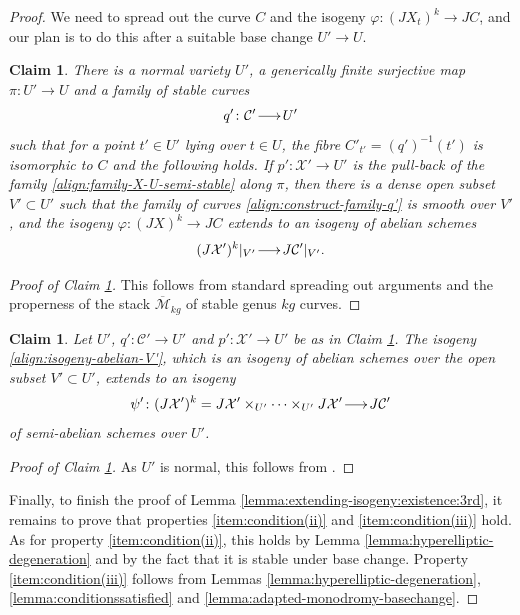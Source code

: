 \documentclass[a4paper,11pt,reqno]{amsart}
\makeatletter
\numberwithin{equation}{section}
\theoremstyle{plain}
\newtheorem{claim}[theorem]{Claim}
\theoremstyle{definition}
\newcommand{\ca}[1]{{\mathcal{#1}}}
\renewcommand{\longrightarrow}{\xymatrix@1@=15pt{\ar[r]&}}
\makeatother
\begin{document}
\begin{proof} 
We need to spread out the curve $C$ and the isogeny $\varphi \colon (JX_t)^k \to JC$, and our plan is to do this after a suitable base change $U' \to U$. 

\begin{claim} \label{claim:claimm1}
    There is a normal variety $U'$, a generically finite surjective map $\pi \colon U'  \to U$  
    and a family of stable curves \begin{align} \label{align:construct-family-q'}q' \colon \ca C' \longrightarrow U'\end{align} 
    such that for a point $t' \in U'$ lying over $t \in U$, the fibre $C'_{t'} = (q')^{-1}(t')$ is isomorphic to $C$ and the following holds.
    If $p' \colon \ca X' \to U'$ is the pull-back of the family \eqref{align:family-X-U-semi-stable} along $\pi$, then 
   there is a dense open subset $V'\subset U'$ such that the family of curves \eqref{align:construct-family-q'} is smooth over $V'$, and the isogeny $\varphi \colon (JX)^k \to JC$ extends to an isogeny of abelian schemes 
\begin{align} \label{align:isogeny-abelian-V'}
(J\ca X')^k|_{V'} \longrightarrow J\ca C'|_{V'}.
\end{align} 
\end{claim}
\begin{proof}[Proof of Claim \ref{claim:claimm1}] 
This follows from standard spreading out arguments and the properness of the stack $\overline{\ca M}_{kg}$ of stable genus $kg$ curves.  
\end{proof}

\noindent
\begin{claim} \label{claim:claimm2}
Let $U'$, $q' \colon \ca C' \to U'$ and $p' \colon \ca X' \to U'$ be as in Claim \ref{claim:claimm1}. The isogeny \eqref{align:isogeny-abelian-V'}, which is an isogeny of abelian schemes over the open subset $V' \subset U'$, extends to an isogeny 
\[
\psi' \colon (J\mathcal X')^k = 
J\mathcal X'\times_{U'}\dots \times_{U'} J\mathcal X'\longrightarrow J\mathcal C'
\]
of semi-abelian schemes over $U'$. 
\end{claim}
\begin{proof}[Proof of Claim \ref{claim:claimm2}]
As $U'$ is normal, this follows from \cite[Chapter I, Proposition 2.7]{faltings-chai}. 
\end{proof}
Finally, to finish the proof of Lemma \ref{lemma:extending-isogeny:existence:3rd}, it remains to prove that properties \ref{item:condition(ii)} and \ref{item:condition(iii)} hold. As for property \ref{item:condition(ii)}, this holds by Lemma \ref{lemma:hyperelliptic-degeneration} and by the fact that it is stable under base change. Property \ref{item:condition(iii)} follows from Lemmas \ref{lemma:hyperelliptic-degeneration}, \ref{lemma:conditionssatisfied} and \ref{lemma:adapted-monodromy-basechange}. 
\end{proof}
\end{document}
